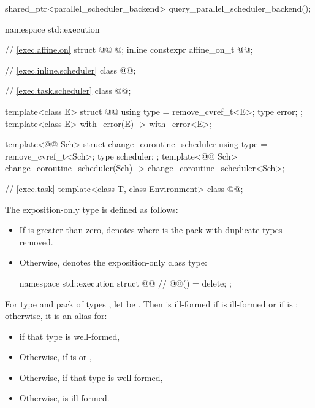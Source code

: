 \begin{codeblock}
{  shared_ptr<parallel_scheduler_backend> query_parallel_scheduler_backend();
}

namespace std::execution {
  // \ref{exec.affine.on}
  struct @@ { @\unspec@ };
  inline constexpr affine_on_t @@{};

  // \ref{exec.inline.scheduler}
  class @@;

  // \ref{exec.task.scheduler}
  class @@;

  template<class E>
  struct @@ {
    using type = remove_cvref_t<E>;
    type error;
  };
  template<class E>
    with_error(E) -> with_error<E>;

  template<@@ Sch>
  struct change_coroutine_scheduler {
    using type = remove_cvref_t<Sch>;
    type scheduler;
  };
  template<@@ Sch>
    change_coroutine_scheduler(Sch) -> change_coroutine_scheduler<Sch>;

  // \ref{exec.task}
  template<class T, class Environment>
    class @@;
}
\end{codeblock}

\pnum
The exposition-only type 
is defined as follows:
\begin{itemize}
\item
If  is greater than zero,
 denotes 
where  is the pack 
with duplicate types removed.
\item
Otherwise,  denotes
the exposition-only class type:
\begin{codeblock}
namespace std::execution {
  struct @@ {        // \expos
    @@() = delete;
  };
}
\end{codeblock}
\end{itemize}

\pnum
For type  and pack of types ,
let  be .
Then  is ill-formed
if  is ill-formed or
if  is ;
otherwise, it is an alias for:
\begin{itemize}
\item
{}
if that type is well-formed,
\item
Otherwise, 
if  is
 or ,
\item
Otherwise, 
if that\linebreak{} type is well-formed,
\item
Otherwise,  is ill-formed.
\end{itemize}

